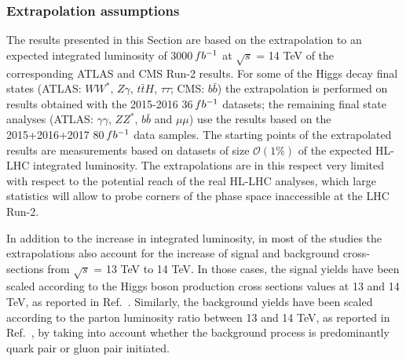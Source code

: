 \subsubsection{Extrapolation assumptions}
\label{sec:HiggsExtrapAss}


The results presented in this Section are based on the extrapolation to an expected integrated luminosity of 3000\,$fb^{-1}$ at $\sqrt{s}$ = 14 TeV of the corresponding ATLAS and CMS Run-2 results. For some of the Higgs decay final states (ATLAS: $WW^*$, $Z\gamma$, $t\bar{t}H$, $\tau\tau$; CMS: $b\bar{b}$) the extrapolation is performed on results obtained with the 2015-2016 36\,$fb^{-1}$ datasets; the remaining final state analyses (ATLAS: $\gamma\gamma$, $ZZ^*$, $b\bar{b}$ and $\mu\mu$) use the results based on the 2015+2016+2017 80\,$fb^{-1}$ data samples. The starting points of the extrapolated results are measurements based on datasets of size $\mathcal{O}(1\%)$ of the expected HL-LHC integrated luminosity. The extrapolations are in this respect very limited with respect to the potential reach of the real HL-LHC analyses, which large statistics will allow to probe corners of the phase space inaccessible at the LHC Run-2.

In addition to the increase in integrated luminosity, in most of the studies the extrapolations also account for the increase of signal and background cross-sections from $\sqrt{s}$ = 13 TeV to 14 TeV.  In those cases, the signal yields have been scaled according to the Higgs boson production cross sections values at 13 and 14 TeV, as reported in Ref.~\cite{deFlorian:2016spz}. Similarly, the background yields have been scaled according to the parton luminosity ratio between 13 and 14 TeV, as reported in Ref.~\cite{Heinemeyer:2013tqa}, by taking into account whether the background process is predominantly quark pair or gluon pair initiated.

